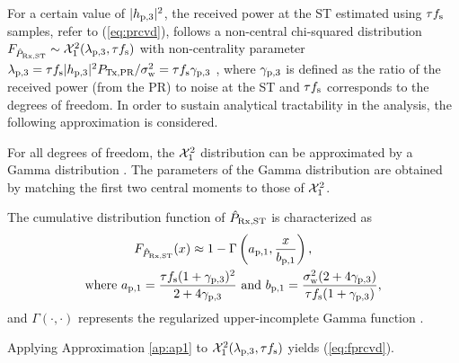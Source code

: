 For a certain value of $|h_{\text{p,3}}|^2$, the received power at the ST estimated using $\tau f_{\text{s}}$ samples, refer to (\ref{eq:prcvd}), follows a non-central chi-squared distribution $\fprcvd \sim \ncchi2(\lpth, \tau \fsam)$ with non-centrality parameter $\lambda_{\text{p,3}} = \tau f_{\text{s}} |h_{\text{p,3}}|^2 P_{\text{Tx,PR}} /\sigma^2_{\text{w}} = \tau f_{\text{s}} {\gamma}_{\text{p,3}}$ \cite{Kay}, where ${\gamma}_{\text{p,3}}$ is defined as the ratio of the received power (from the PR) to noise at the ST and $\tau f_{\text{s}}$ corresponds to the degrees of freedom. In order to sustain analytical tractability in the analysis, the following approximation is considered. 
\begin{approxi} \label{ap:ap1}
\normalfont
For all degrees of freedom, the $\ncchi2$ distribution can be approximated by a Gamma distribution \cite{abramo}. The parameters of the Gamma distribution are obtained by matching the first two central moments to those of $\ncchi2$.
\end{approxi}
\begin{lemma} \label{lm:lm1}
\normalfont
The cumulative distribution function of $\hat{P}_{\text{Rx,ST}}$ is characterized as 
\begin{align}
F_{\hat{P}_{\text{Rx,ST}}}(x) \approx 1 - \Gamma&\left(a_{\text{p,1}}, \frac{x}{b_{\text{p,1}}}\right) \label{eq:fprcvd}, \\ 
\text{where  } a_{\text{p,1}} = \frac{\tau f_{\text{s}} (1 + {\gamma}_{\text{p,3}})^2}{2 + 4 {\gamma}_{\text{p,3}}} &\text{ and } b_{\text{p,1}} = \frac{\sigma^2_{\text{w}} (2 + 4 {\gamma}_{\text{p,3}})}{\tau f_{\text{s}} (1 + {\gamma}_{\text{p,3}})},  \label{eq:para_po} 
\end{align} 
and $\Gamma(\cdot, \cdot)$ represents the regularized upper-incomplete Gamma function \cite{abramo}. 
\end{lemma}
\begin{IEEEproof}
Applying Approximation \ref{ap:ap1} to $\ncchi2(\lpth, \tau \fsam)$ yields (\ref{eq:fprcvd}). 
\end{IEEEproof}

